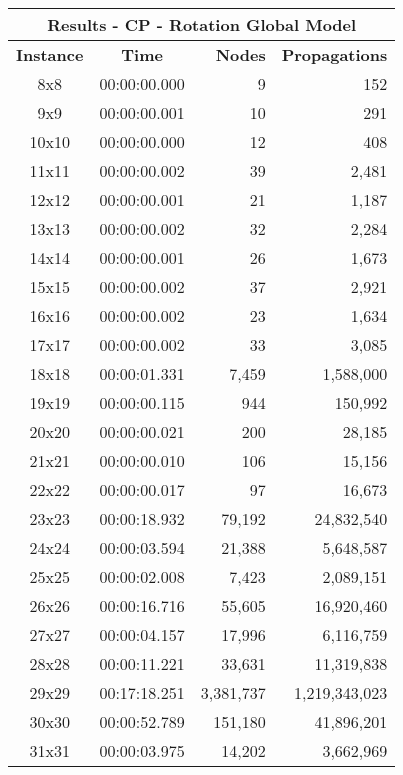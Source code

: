 
\begin{center}
    \begin{tabular}{|c|c|r|r|}
        \hline
        \multicolumn{4}{|c|}{\textbf{Results - CP - Rotation Global Model}} \\
        \hline
        \textbf{Instance} & \textbf{Time} & \textbf{Nodes} & \textbf{Propagations} \\
        
        \hline
		8x8 & 00:00:00.000 & 9 & 152 \\ \hline
		9x9 & 00:00:00.001 & 10 & 291 \\ \hline
		10x10 & 00:00:00.000 & 12 & 408 \\ \hline
		11x11 & 00:00:00.002 & 39 & 2,481 \\ \hline
		12x12 & 00:00:00.001 & 21 & 1,187 \\ \hline
		13x13 & 00:00:00.002 & 32 & 2,284 \\ \hline
		14x14 & 00:00:00.001 & 26 & 1,673 \\ \hline
		15x15 & 00:00:00.002 & 37 & 2,921 \\ \hline
		16x16 & 00:00:00.002 & 23 & 1,634 \\ \hline
		17x17 & 00:00:00.002 & 33 & 3,085 \\ \hline
		18x18 & 00:00:01.331 & 7,459 & 1,588,000 \\ \hline
		19x19 & 00:00:00.115 & 944 & 150,992 \\ \hline
		20x20 & 00:00:00.021 & 200 & 28,185 \\ \hline
		21x21 & 00:00:00.010 & 106 & 15,156 \\ \hline
		22x22 & 00:00:00.017 & 97 & 16,673 \\ \hline
		23x23 & 00:00:18.932 & 79,192 & 24,832,540 \\ \hline
		24x24 & 00:00:03.594 & 21,388 & 5,648,587 \\ \hline
		25x25 & 00:00:02.008 & 7,423 & 2,089,151 \\ \hline
		26x26 & 00:00:16.716 & 55,605 & 16,920,460 \\ \hline
		27x27 & 00:00:04.157 & 17,996 & 6,116,759 \\ \hline
		28x28 & 00:00:11.221 & 33,631 & 11,319,838 \\ \hline
		29x29 & 00:17:18.251 & 3,381,737 & 1,219,343,023 \\ \hline
		30x30 & 00:00:52.789 & 151,180 & 41,896,201 \\ \hline
		31x31 & 00:00:03.975 & 14,202 & 3,662,969 \\ \hline

\end{tabular}
\end{center}
